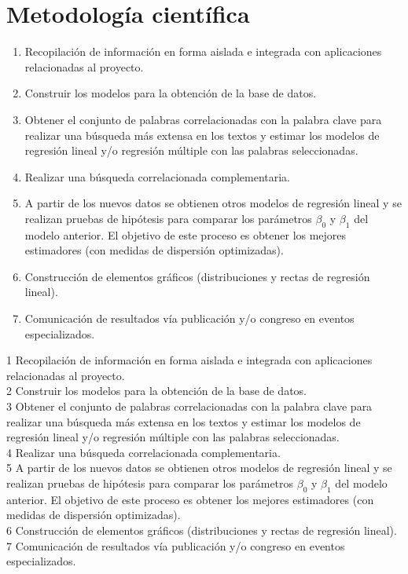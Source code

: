 \section {Metodología científica}
\begin{enumerate}
\item Recopilación de información en forma aislada e integrada con aplicaciones relacionadas al proyecto.
\item Construir los modelos para la obtención de la base de datos.
\item Obtener el conjunto de palabras correlacionadas con la palabra clave para realizar una búsqueda más extensa en los textos y estimar los modelos de regresión lineal y/o regresión múltiple con las palabras seleccionadas.
\item Realizar una búsqueda correlacionada complementaria.
\item A partir de los nuevos datos se obtienen otros modelos de regresión lineal y se realizan pruebas de hipótesis para comparar los parámetros $\beta_0$ y $\beta_1$ del modelo anterior. El objetivo de este proceso es obtener los mejores estimadores (con medidas de dispersión optimizadas).
\item Construcción de elementos gráficos (distribuciones y rectas de regresión lineal).
\item Comunicación de resultados vía publicación y/o congreso en eventos especializados.
\end{enumerate}
1 Recopilación de información en forma aislada e integrada con aplicaciones relacionadas al proyecto.\\
2 Construir los modelos para la obtención de la base de datos.\\
3 Obtener el conjunto de palabras correlacionadas con la palabra clave para realizar una búsqueda más extensa en los textos y estimar los modelos de regresión lineal y/o regresión múltiple con las palabras seleccionadas.\\
4 Realizar una búsqueda correlacionada complementaria.\\
5 A partir de los nuevos datos se obtienen otros modelos de regresión lineal y se realizan pruebas de hipótesis para comparar los parámetros $\beta_0$ y $\beta_1$ del modelo anterior. El objetivo de este proceso es obtener los mejores estimadores (con medidas de dispersión optimizadas).\\
6 Construcción de elementos gráficos (distribuciones y rectas de regresión lineal).\\
7 Comunicación de resultados vía publicación y/o congreso en eventos especializados.